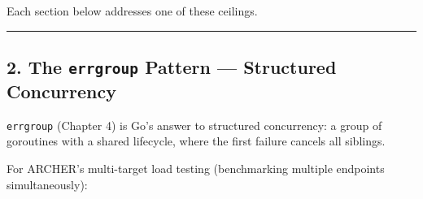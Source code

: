 \documentclass[
]{article}
\begin{document}
Each section below addresses one of these ceilings.

\begin{center}\rule{0.5\linewidth}{0.5pt}\end{center}

\hypertarget{the-errgroup-pattern-structured-concurrency}{%
\subsection{\texorpdfstring{2. The \texttt{errgroup} Pattern ---
Structured
Concurrency}{2. The errgroup Pattern --- Structured Concurrency}}\label{the-errgroup-pattern-structured-concurrency}}

\texttt{errgroup} (Chapter 4) is Go's answer to structured concurrency:
a group of goroutines with a shared lifecycle, where the first failure
cancels all siblings.

For ARCHER's multi-target load testing (benchmarking multiple endpoints
simultaneously):
\end{document}
